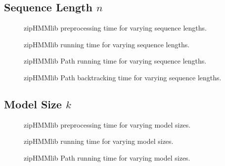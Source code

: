 \documentclass[11pt,twoside,a4,danish,english,report]{memoir}
\begin{document}
\subsection{Sequence Length $n$}
\label{sec:sequence-length-n}

\begin{figure}[H]
  \centering
  
  \caption{zipHMMlib preprocessing time for varying sequence lengths.}
  \label{fig:pre_viterbi_n}
\end{figure}

\begin{figure}[H]
  \centering
  
  \caption{zipHMMlib running time for varying sequence lengths.}
  \label{fig:assymptotic_viterbi_n}
\end{figure}

\begin{figure}[H]
  \centering
  
  \caption{zipHMMlib Path running time for varying sequence lengths.}
  \label{fig:assymptotic_viterbi_path_n}
\end{figure}

\begin{figure}[H]
  \centering
  
  \caption{zipHMMlib Path backtracking time for varying sequence lengths.}
  \label{fig:assymptotic_viterbi_backtrack_n}
\end{figure}

\subsection{Model Size $k$}
\label{sec:model-size-k}

\begin{figure}[H]
  \centering
  
  \caption{zipHMMlib preprocessing time for varying model sizes.}
  \label{fig:pre_viterbi_k}
\end{figure}

\begin{figure}[H]
  \centering
  
  \caption{zipHMMlib running time for varying model sizes.}
  \label{fig:assymptotic_viterbi_k}
\end{figure}

\begin{figure}[H]
  \centering
  
  \caption{zipHMMlib Path running time for varying model sizes.}
  \label{fig:assymptotic_viterbi_path_k}
\end{figure}
\end{document}
